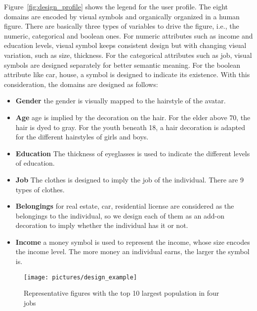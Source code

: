 Figure~\ref{fig:design_profile} shows the legend for the user profile. The eight domains are encoded by visual symbols and organically organized in a human figure. There are basically three types of variables to drive the figure, i.e., the numeric, categorical and boolean ones. For numeric attributes such as income and education levels, visual symbol keeps consistent design but with changing visual variation, such as size, thickness. For the categorical attributes such as job, visual symbols are designed separately for better semantic meaning. For the boolean attribute like car, house, a symbol is designed to indicate its existence. With this consideration, the domains are designed as follows:



\begin{itemize}
\item \textbf{Gender} the gender is visually mapped to the hairstyle of the avatar.
\item \textbf{Age} age is implied by the decoration on the hair. For the elder above 70, the hair is dyed to gray. For the youth beneath 18, a hair decoration is adapted for the different hairstyles of girls and boys.
\item \textbf{Education} The thickness of eyeglasses is used to indicate the different levels of education.
\item \textbf{Job} The clothes is designed to imply the job of the individual. There are 9 types of clothes.
\item \textbf{Belongings} for real estate, car, residential license are considered as the belongings to the individual, so we design each of them as an add-on decoration to imply whether the individual has it or not.
\item \textbf{Income} a money symbol is used to represent the income, whose size encodes the income level. The more money an individual earns, the larger the symbol is.
\end{itemize}

\begin{figure}[htb!]
 \centering %
 \texttt{[image: pictures/design\_example]}
 \caption{Representative figures with the top 10 largest population in four jobs}
 \label{fig:div_example}
\end{figure}


